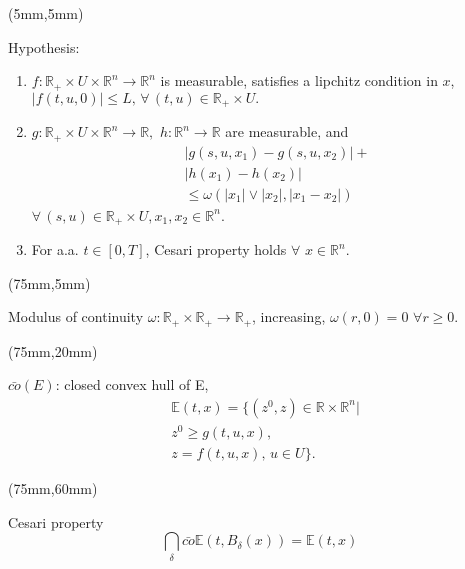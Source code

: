 \begin{frame}[plain]
	\begin{textblock*}{60mm}(5mm,5mm)
		\begin{graybox}{Hypothesis:}
			\begin{enumerate}[(\textbf{{C}}-1)]
				\item<1->
					$
						f:\mathbb{R}_{+}\times U
						\times \mathbb{R}^n\rightarrow 
						\mathbb{R}^n
					$ is measurable, satisfies a lipchitz
					 condition in $x$,
					$
						|f(t,u,0)|\leq L,\,
						 \forall\,(t,u)\in
						 \mathbb{R}_{+}\times U .
					$
				\item<2->
					$
						g:\mathbb{R}_{+}\times U\times 
						\mathbb{R}^n\rightarrow \mathbb{R},
					$ 
					$
						h:\mathbb{R}^n\rightarrow \mathbb{R}
					$ are measurable, and
					\begin{align*}
						&|g(s,u,x_1)-g(s,u,x_2)|+\\
						&|h(x_1)-h(x_2)|\\
						&\leq \omega(|x_1|\vee |x_2|,|x_1-x_2|)
					\end{align*}
					$
						\forall\, (s,u)\in \mathbb{R}_{+}
						\times U,x_1,x_2\in \mathbb{R}^n
					$.
				\item<3->
					For a.a. $t\in[0,T]$, Cesari property holds $\forall$ $x\in \mathbb{R}^n$.
			\end{enumerate}	
		\end{graybox}
	\end{textblock*}
	{
		\begin{textblock*}{50mm}(75mm,5mm)
			\begin{yellowbox}{Modulus of continuity}
				$\omega:\mathbb{R}_{+}\times\mathbb{R}_{+}\rightarrow \mathbb{R}_{+}$, increasing, $\omega(r,0)=0$ 
				${\forall r\geq 0}$.
			\end{yellowbox}
		\end{textblock*}
	}
	{
		\begin{textblock*}{50mm}(75mm,20mm)
			\begin{yellowbox}{}
				$\bar{co}(E)$: closed convex hull of E,
				\begin{align*}
					&\mathbb{E}(t,x)=\{(z^0,z)\in \mathbb{R}\times \mathbb{R}^n|\\
					&z^0\geq g(t,u,x),\\
					&z=f(t,u,x),\, u\in U\}.
				\end{align*}			
			\end{yellowbox}
		\end{textblock*}
	
		\begin{textblock*}{50mm}(75mm,60mm)
			\begin{yellowbox}{Cesari property}
				\begin{equation*}
				\bigcap_{\delta}\bar{co}\mathbb{E}(t,B_{\delta}(x))=\mathbb{E}(t,x)
				\end{equation*}			
			\end{yellowbox}
		\end{textblock*}
	}
\end{frame}

